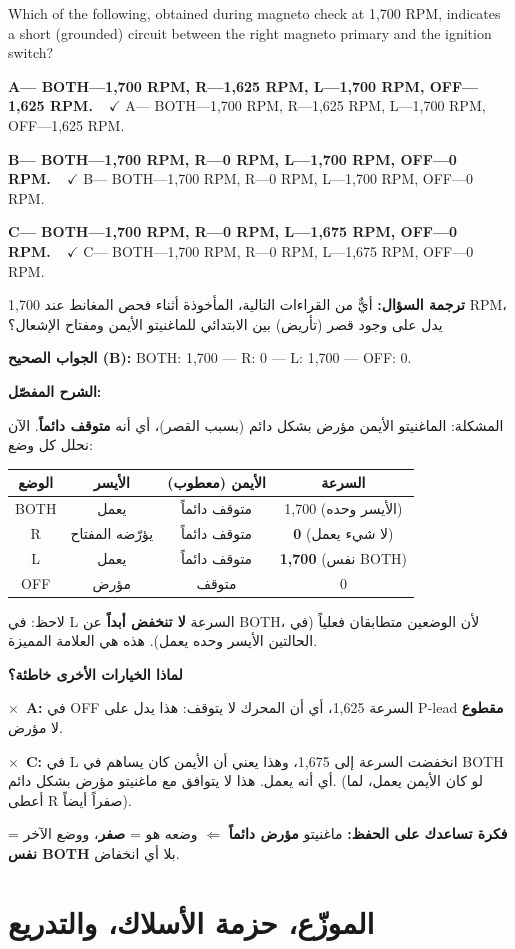 \documentclass[11pt,a4paper]{article}
\newcommand{\en}[1]{\textenglish{#1}}
\newcommand{\correctletter}{}
\newcommand{\opt}[2]{%
  \ifdefstring{\correctletter}{#1}%
    {\textcolor{ansgreen}{\textbf{#1— #2\ \ $\checkmark$}}}%
    {#1— #2}\par}
\newcommand{\Q}[6]{%
  \renewcommand{\correctletter}{#6}%
  \par\bigskip
  \phantomsection\label{q#1}%
  \begin{tcolorbox}[enhanced,breakable,colback=qback,colframe=qframe,
      arc=2mm,boxrule=0.8pt,fonttitle=\bfseries,
      title={\en{Question #1}}]
    \begin{english}
      #2\par\smallskip
      \opt{A}{#3}\opt{B}{#4}\opt{C}{#5}
    \end{english}
  \end{tcolorbox}}
\newcommand{\tr}[1]{\textbf{\textcolor{qframe}{ترجمة السؤال:}} #1\par}
\newcommand{\ans}[2]{%
  \begin{tcolorbox}[colback=ansback,colframe=ansgreen,boxrule=0.6pt,arc=1.5mm,
      left=4pt,right=4pt,top=2pt,bottom=2pt]
    \textbf{\textcolor{ansgreen}{الجواب الصحيح (\en{#1}):}} #2
  \end{tcolorbox}}
\newcommand{\sharh}[1]{\textbf{\textcolor{conceptc}{الشرح المفصّل:}}\par #1\par}
\newcommand{\nohead}{\textbf{\textcolor{wrongc}{لماذا الخيارات الأخرى خاطئة؟}}\par}
\newcommand{\no}[2]{\hspace*{1em}\textcolor{wrongc}{$\times$}\ \textbf{\en{#1}:} #2\par}
\newcommand{\tip}[1]{%
  \begin{tcolorbox}[colback=tipback,colframe=tipframe,boxrule=0.5pt,arc=1.5mm,
      left=4pt,right=4pt,top=2pt,bottom=2pt]
    \textbf{فكرة تساعدك على الحفظ:} #1
  \end{tcolorbox}}
\begin{document}
\Q{8567}{Which of the following, obtained during magneto check at 1,700 RPM, indicates a short (grounded) circuit between the right magneto primary and the ignition switch?}
{BOTH—1,700 RPM, R—1,625 RPM, L—1,700 RPM, OFF—1,625 RPM.}
{BOTH—1,700 RPM, R—0 RPM, L—1,700 RPM, OFF—0 RPM.}
{BOTH—1,700 RPM, R—0 RPM, L—1,675 RPM, OFF—0 RPM.}{B}
\tr{أيٌّ من القراءات التالية، المأخوذة أثناء فحص المغانط عند 1,700 \en{RPM}، يدل على وجود قصر (تأريض) بين الابتدائي للماغنيتو الأيمن ومفتاح الإشعال؟}
\ans{B}{\en{BOTH}: 1,700 — \en{R}: 0 — \en{L}: 1,700 — \en{OFF}: 0.}
\sharh{المشكلة: الماغنيتو الأيمن مؤرض بشكل دائم (بسبب القصر)، أي أنه \textbf{متوقف دائماً}. الآن نحلل كل وضع:
\begin{center}
\begin{tabular}{|c|c|c|c|}
\hline
\textbf{الوضع} & \textbf{الأيسر} & \textbf{الأيمن (معطوب)} & \textbf{السرعة}\\\hline
\en{BOTH} & يعمل & متوقف دائماً & 1,700 (الأيسر وحده)\\\hline
\en{R} & يؤرّضه المفتاح & متوقف دائماً & \textbf{0} (لا شيء يعمل)\\\hline
\en{L} & يعمل & متوقف دائماً & \textbf{1,700} (نفس \en{BOTH})\\\hline
\en{OFF} & مؤرض & متوقف & 0\\\hline
\end{tabular}
\end{center}
لاحظ: في \en{L} السرعة \textbf{لا تنخفض أبداً} عن \en{BOTH}، لأن الوضعين متطابقان فعلياً (في الحالتين الأيسر وحده يعمل). هذه هي العلامة المميزة.}
\nohead
\no{A}{في \en{OFF} السرعة 1,625، أي أن المحرك لا يتوقف: هذا يدل على \en{P-lead} \textbf{مقطوع} لا مؤرض.}
\no{C}{في \en{L} انخفضت السرعة إلى 1,675، وهذا يعني أن الأيمن كان يساهم في \en{BOTH} أي أنه يعمل. هذا لا يتوافق مع ماغنيتو مؤرض بشكل دائم. (لو كان الأيمن يعمل، لما أعطى \en{R} صفراً أيضاً).}
\tip{ماغنيتو \textbf{مؤرض دائماً} $\Leftarrow$ وضعه هو = \textbf{صفر}، ووضع الآخر = \textbf{نفس \en{BOTH}} بلا أي انخفاض.}

\newpage
\section{الموزّع، حزمة الأسلاك، والتدريع}
\end{document}
